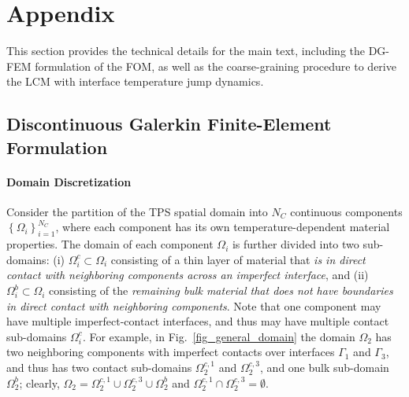 \appendix
\section{Appendix}

This section provides the technical details for the main text, including the DG-FEM formulation of the FOM, as well as the coarse-graining procedure to derive the LCM with interface temperature jump dynamics.

\subsection{Discontinuous Galerkin Finite-Element Formulation}

\paragraph*{Domain Discretization} Consider the partition of the TPS spatial domain into $N_{C}$ continuous components  $\left\{\Omega_i\right\}_{i=1}^{N_C}$, where each component has its own temperature-dependent material properties. The domain of each component $\Omega_i$ is further divided into two sub-domains: (i) $\Omega_i^c\subset\Omega_i$ consisting of a thin layer of material that \emph{is in direct contact with neighboring components across an imperfect interface}, and (ii) $\Omega_i^{b}\subset\Omega_i$ consisting of the \emph{remaining bulk material that does not have boundaries in direct contact with neighboring components}. Note that one component may have multiple imperfect-contact interfaces, and thus may have multiple contact sub-domains $\Omega_i^c$. For example, in Fig.~\ref{fig_general_domain} the domain $\Omega_2$ has two neighboring components with imperfect contacts over interfaces $\Gamma_1$ and $\Gamma_3$, and thus has two contact sub-domains $\Omega_2^{c,1}$ and $\Omega_2^{c,3}$, and one bulk sub-domain $\Omega_2^{b}$; clearly, $\Omega_2 = \Omega_2^{c,1}\cup\Omega_2^{c,3}\cup\Omega_2^{b}$ and $\Omega_2^{c,1}\cap\Omega_2^{c,3} = \emptyset$.

